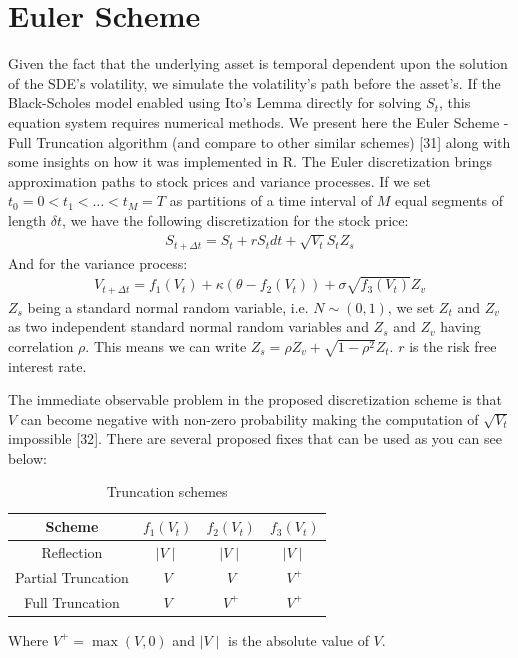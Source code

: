 \documentclass[12pt,oneside]{reedthesis}
\theoremstyle{definition}
\theoremstyle{definition}
\theoremstyle{remark}
\begin{document}
  \section{Euler Scheme}\label{euler-scheme}
  
  Given the fact that the underlying asset is temporal dependent upon the
  solution of the SDE's volatility, we simulate the volatility's path
  before the asset's. If the Black-Scholes model enabled using Ito's Lemma
  directly for solving \(S_t\), this equation system requires numerical
  methods. We present here the Euler Scheme - Full Truncation algorithm
  (and compare to other similar schemes) {[}31{]} along with some insights
  on how it was implemented in R. The Euler discretization brings
  approximation paths to stock prices and variance processes. If we set
  \(t_0 = 0 < t_1 < \dots < t_M = T\) as partitions of a time interval of
  \(M\) equal segments of length \(\delta t\), we have the following
  discretization for the stock price:
  \begin{align}
  S_{t + \Delta t} = S_t + rS_t dt + \sqrt{V_t} S_t Z_s
  \end{align}
  \noindent
  And for the variance process:
  \begin{align}
  V_{t + \Delta t} = f_1(V_{t}) + \kappa (\theta - f_2(V_{t})) + \sigma \sqrt{f_3(V_{t})} Z_v 
  \end{align}
  \noindent
  \(Z_s\) being a standard normal random variable, i.e. \(N\sim(0,1)\), we
  set \(Z_t\) and \(Z_v\) as two independent standard normal random
  variables and \(Z_s\) and \(Z_v\) having correlation \(\rho\). This
  means we can write \(Z_s = \rho Z_v + \sqrt{1-\rho^2} Z_t\). \(r\) is
  the risk free interest rate.
  
  The immediate observable problem in the proposed discretization scheme
  is that \(V\) can become negative with non-zero probability making the
  computation of \(\sqrt{V_t}\) impossible {[}32{]}. There are several
  proposed fixes that can be used as you can see below:
  \begin{table}[ht]
  \centering
  \begin{tabular}{cccc}
    \hline 
  Scheme & $f_1(V_{t})$ & $f_2(V_{t})$ & $f_3(V_{t})$ \\ 
    \hline 
  Reflection & $\mid V \mid$ & $\mid V \mid$ & $\mid V \mid$ \\ 
    Partial Truncation & $V$ & $V$ & $V^+$ \\ 
    Full Truncation & $V$ & $V^+$ & $V^+$ \\ 
     \hline 
  \end{tabular}
  \caption{Truncation schemes} 
  \label{box}
  \end{table}
  Where \(V^+ = \max(V,0)\) and \(\mid V \mid\) is the absolute value of
  \(V\).
  
\end{document}
